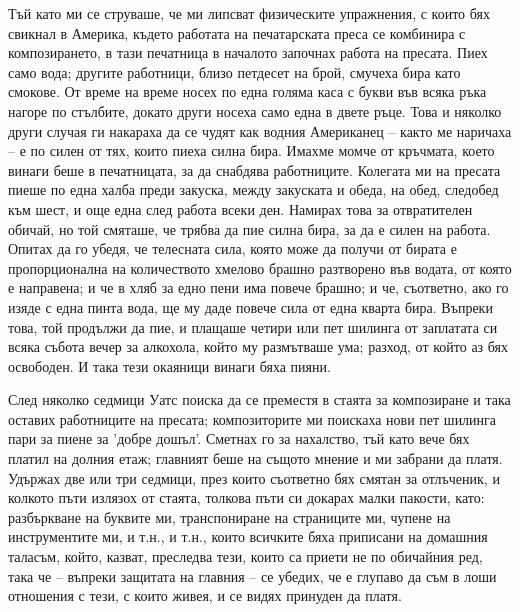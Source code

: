 \documentclass[12pt]{book}
\begin{document}
Тъй като ми се струваше, че ми липсват физическите упражнения, с които бях свикнал в Америка, където работата на печатарската преса се комбинира с композирането, в тази печатница в началото започнах работа на пресата. Пиех само вода; другите работници, близо петдесет на брой, смучеха бира като смокове. От време на време носех по една голяма каса с букви във всяка ръка нагоре по стълбите, докато други носеха само една в двете ръце. Това и няколко други случая ги накараха да се чудят как водния Американец – както ме наричаха – е по силен от тях, които пиеха силна бира. Имахме момче от кръчмата, което винаги беше в печатницата, за да снабдява работниците. Колегата ми на пресата пиеше по една халба преди закуска, между закуската и обеда, на обед, следобед към шест, и още една след работа всеки ден. Намирах това за отвратителен обичай, но той смяташе, че трябва да пие силна бира, за да е силен на работа. Опитах да го убедя, че телесната сила, която може да получи от бирата е пропорционална на количеството хмелово брашно разтворено във водата, от която е направена; и че в хляб за едно пени има повече брашно; и че, съответно, ако го изяде с една пинта вода, ще му даде повече сила от една кварта бира. Въпреки това, той продължи да пие, и плащаше четири или пет шилинга от заплатата си всяка събота вечер за алкохола, който му размътваше ума; разход, от който аз бях освободен. И така тези окаяници винаги бяха пияни.

След няколко седмици Уатс поиска да се преместя в стаята за композиране и така оставих работниците на пресата; композиторите ми поискаха нови пет шилинга пари за пиене за 'добре дошъл'. Сметнах го за нахалство, тъй като вече бях платил на долния етаж; главният беше на същото мнение и ми забрани да платя. Удържах две или три седмици, през които съответно бях смятан за отлъченик, и колкото пъти излязох от стаята, толкова пъти си докарах малки пакости, като: разбъркване на буквите ми, транспониране на страниците ми, чупене на инструментите ми, и т.н., и т.н., които всичките бяха приписани на домашния таласъм, който, казват, преследва тези, които са приети не по обичайния ред, така че – въпреки защитата на главния – се убедих, че е глупаво да съм в лоши отношения с тези, с които живея, и се видях принуден да платя.
\end{document}

